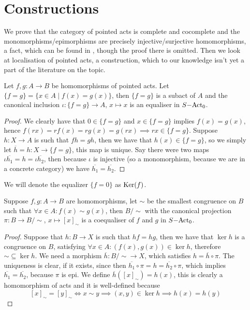 \section{Constructions}
    We prove that the category of pointed acts is complete and cocomplete and the monomorphisms/epimorphisms are precisely injective/surjective homomorphisms, a fact, which can be found in \cite{Kilp00}, though the proof there is omitted. Then we look 
    at localisation of pointed acts, a construction, which to our knowledge isn't yet a part of the literature on the topic.
\begin{proposition}
    Let $f,g: A \to B$ be homomorphisms of pointed acts. Let $\{f=g\} = \{x\in A \mid f(x) = g(x)\}$, then $\{f=g\}$ is a subact of $A$ and 
    the canonical inclusion $\iota: \{f=g\} \to A$, $x\mapsto x$ is an equaliser in $S\mathrm{-Act}_0$.
\end{proposition}
\begin{proof}
    We clearly have that $0\in\{f=g\}$ and $x\in\{f=g\}$ implies $f(x)=g(x)$, hence $f(rx)=rf(x)=rg(x)=g(rx) \implies rx\in\{f=g\}$. 
    Suppose $h: X \to A$ is such that $fh=gh$, then we have that $h(x)\in\{f=g\}$, so we simply let $\overline{h} = h: X\to\{f=g\}$, this
    map is unique. Say there were two maps $\iota\overline{h_1}=h=\iota\overline{h_2}$, then because $\iota$ is injective (so a monomorphism, 
    because we are in a concrete category) we have $\overline{h_1}=\overline{h_2}$.
\end{proof}
    We will denote the equalizer $\{f=0\}$ as $\mathrm{Ker}(f)$. 
\begin{proposition}
    Suppose $f,g: A\to B$ are homomorphisms, let $\sim$ be the smallest congruence on $B$ such that $\forall x\in A: f(x)\sim g(x)$, then 
    $B/\sim$ with the canonical projection $\pi: B\to B/\sim$, $x\mapsto [x]_\sim$ is a coequaliser of $f$ and $g$ in $S\mathrm{-Act}_0$. 
\end{proposition}
\begin{proof}
    Suppose that $h: B\to X$ is such that $hf=hg$, then we have that $\ker{h}$ is a congruence on $B$, satisfying 
    $\forall x\in A: (f(x),g(x))\in\ker{h}$, therefore $\sim\subseteq\ker{h}$. We need a morphism $\overline{h}: B/\sim \to X$, which satisfies 
    $h = \overline{h} \circ\pi$. The uniqueness is clear, if it exists, since then $\overline{h_1}\circ\pi = h = \overline{h_2}\circ\pi$, 
    which implies $\overline{h_1}=\overline{h_2}$, because $\pi$ is epi. We define $\overline{h}([x]_\sim) = h(x)$, this 
    is clearly a homomorphism of acts and it is well-defined because
    \[
        [x]_\sim = [y]_\sim\iff x\sim y \implies (x,y)\in\ker{h} \implies h(x)=h(y)
    \] 
\end{proof}
